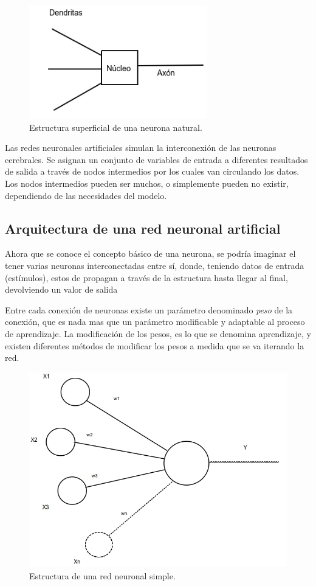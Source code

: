 \documentclass[a4paper,12pt,oneside,spanish]{book}
\begin{document}
\begin{figure}[h!]
	\includegraphics[width=220pt]{Imagenes/neurona.jpg}
	\centering
	\caption{Estructura superficial de una neurona natural.}
	\label{fig:haarlike1}
\end{figure}

Las redes neuronales artificiales simulan la interconexión de las neuronas cerebrales. Se asignan un conjunto de variables de entrada a diferentes resultados de salida a través de nodos intermedios por los cuales van circulando los datos. Los nodos intermedios pueden ser muchos, o simplemente pueden no existir, dependiendo de las necesidades del modelo. \par

\subsection{Arquitectura de una red neuronal artificial}
Ahora que se conoce el concepto básico de una neurona, se podría imaginar el tener varias neuronas interconectadas entre sí, donde, teniendo datos de entrada (estímulos), estos de propagan a través de la estructura hasta llegar al final, devolviendo un valor de salida\par

Entre cada conexión de neuronas existe un parámetro denominado \textit{peso} de la conexión, que es nada mas que un parámetro modificable y adaptable al proceso de aprendizaje. La modificación de los pesos, es lo que se denomina aprendizaje, y existen diferentes métodos de modificar los pesos a medida que se va iterando la red.\par

\begin{figure}[h!]
	\includegraphics[width=340pt]{Imagenes/network1.jpg}
	\centering
	\caption{Estructura de una red neuronal simple.}
	\label{fig:network1}
\end{figure}
\end{document}
